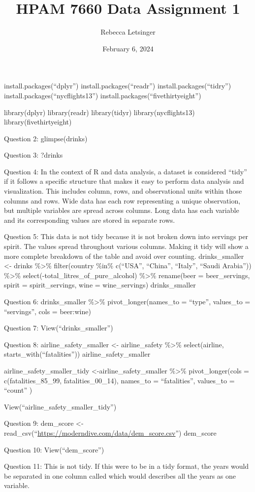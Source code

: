 \documentclass[
]{article}
\title{HPAM 7660 Data Assignment 1}
\author{Rebecca Letsinger}
\date{February 6, 2024}
\begin{document}
\maketitle

install.packages(``dplyr'') install.packages(``readr'')
install.packages(``tidry'') install.packages(``nycflights13'')
install.packages(``fivethirtyeight'')

library(dplyr) library(readr) library(tidyr) library(nycflights13)
library(fivethirtyeight)

Question 2: glimpse(drinks)

Question 3: ?drinks

Question 4: In the context of R and data analysis, a dataset is
considered ``tidy'' if it follows a specific structure that makes it
easy to perform data analysis and visualization. This includes column,
rows, and observational units within those columns and rows. Wide data
has each row representing a unique observation, but multiple variables
are spread across columns. Long data has each variable and its
corresponding values are stored in separate rows.

Question 5: This data is not tidy because it is not broken down into
servings per spirit. The values spread throughout various columns.
Making it tidy will show a more complete breakdown of the table and
avoid over counting. drinks\_smaller \textless- drinks \%\textgreater\%
filter(country \%in\% c(``USA'', ``China'', ``Italy'', ``Saudi
Arabia'')) \%\textgreater\% select(-total\_litres\_of\_pure\_alcohol)
\%\textgreater\% rename(beer = beer\_servings, spirit =
spirit\_servings, wine = wine\_servings) drinks\_smaller

Question 6: drinks\_smaller \%\textgreater\% pivot\_longer(names\_to =
``type'', values\_to = ``servings'', cols = beer:wine)

Question 7: View(``drinks\_smaller'')

Question 8: airline\_safety\_smaller \textless- airline\_safety
\%\textgreater\% select(airline, starts\_with(``fatalities''))
airline\_safety\_smaller

airline\_safety\_smaller\_tidy \textless-airline\_safety\_smaller
\%\textgreater\% pivot\_longer(cols = c(fatalities\_85\_99,
fatalities\_00\_14), names\_to = ``fatalities'', values\_to = ``count''
)

View(``airline\_safety\_smaller\_tidy'')

Question 9: dem\_score \textless-
read\_csv(``\url{https://moderndive.com/data/dem_score.csv}'')
dem\_score

Question 10: View(``dem\_score'')

Question 11: This is not tidy. If this were to be in a tidy format, the
years would be separated in one column called which would describes all
the years as one variable.
\end{document}
